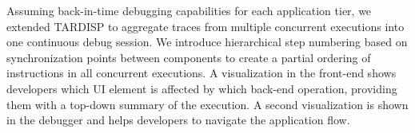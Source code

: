 Assuming back-in-time debugging capabilities for each application tier, 
we extended TARDISP to aggregate traces from multiple concurrent executions into one continuous debug session.
We introduce hierarchical step numbering based on synchronization points between components to create a partial ordering of instructions in all concurrent executions.
A visualization in the front-end shows developers which UI element is affected by which back-end operation, providing them with a top-down summary of the execution.
A second visualization is shown in the debugger and helps developers to navigate the application flow.


%
%
%
%
